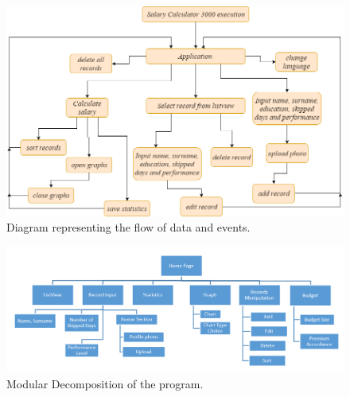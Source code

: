 \documentclass[a4]{article}
\begin{document}
\begin{figure}[ht]
\begin{center}
  \includegraphics[width=\textwidth]{flow.png}
  \caption{Diagram representing the flow of data and events.}
  \label{fig:flow}
\end{center}
\end{figure}

\begin{figure}[ht]
\begin{center}
  \includegraphics[width=\textwidth]{modular.png}
  \caption{Modular Decomposition of the program.}
  \label{fig:modular}
\end{center}
\end{figure}
\end{document}
